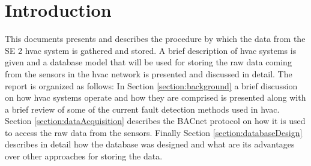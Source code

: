 \section{Introduction}

This documents presents and describes the procedure by which the data from the SE 2 \gls{hvac} system is gathered and stored. A brief description of \gls{hvac} systems is given and a database model that will be used for storing the raw data coming from the sensors in the \gls{hvac} network is presented and discussed in detail. The report is organized as follows: In Section \ref{section:background} a brief discussion on how \gls{hvac} systems operate and how they are comprised is presented along with a brief review of some of the current fault detection methods used in \gls{hvac}. Section \ref{section:dataAcquisition} describes the BACnet protocol on how it is used to access the raw data from the sensors. Finally Section \ref{section:databaseDesign} describes in detail how the database was designed and what are its advantages over other approaches for storing the data.